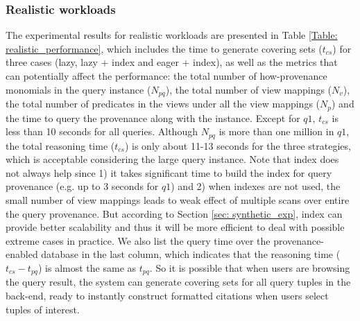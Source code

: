 
\subsubsection{Realistic workloads}
\label{ssec: realistic}
The experimental results for realistic workloads are presented in Table \ref{Table: realistic_performance}, which includes the time to generate covering sets ($t_{cs}$) for three cases (lazy, lazy + index and eager + index), as well as the metrics that can potentially affect the performance: the total number of how-provenance monomials in the query instance ($N_{pq}$), the total number of view mappings ($N_v$), the total number of predicates in the views under all the view mappings ($N_p$) and the time to query the provenance along with the instance. Except for $q1$, $t_{cs}$ is less than 10 seconds for all queries. Although $N_{pq}$ is more than one million in $q1$, the total reasoning time ($t_{cs}$) is only about 11-13 seconds for the three strategies, which is acceptable considering the large query instance. Note that index does not always help since 1) it takes significant time to build the index for query provenance (e.g. up to 3 seconds for $q1$) and 2) when indexes are not used, the small number of view mappings leads to weak effect of multiple scans over entire the query provenance. But according to Section \ref{sec: synthetic_exp}, index can provide better scalability and thus it will be more efficient to deal with possible extreme cases in practice. We also list the query time over the provenance-enabled database in the last column, which indicates that the reasoning time ($t_{cs} - t_{pq}$) is almost the same as $t_{pq}$. So it is possible that when users are browsing the query result, the system can generate covering sets for all query tuples in the back-end, ready to instantly construct formatted citations when users select tuples of interest.



